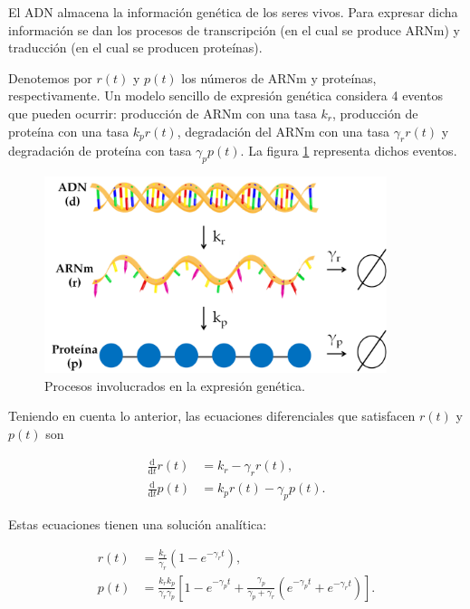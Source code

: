 \documentclass[11pt,letterpaper]{exam}
\begin{document}
\begin{questions}

El ADN almacena la informaci\'on gen\'etica de los seres vivos. Para
expresar dicha informaci\'on se dan los procesos de transcripci\'on
(en el cual se produce ARNm) y traducci\'on (en el cual se producen
prote\'inas).   

Denotemos por $r(t)$ y $p(t)$ los n\'umeros de ARNm y prote\'inas,
respectivamente. Un modelo sencillo de expresi\'on gen\'etica
considera 4 eventos que pueden ocurrir: producci\'on de ARNm con una
tasa $k_r$, producci\'on de prote\'ina con una tasa $k_p r(t)$,
degradaci\'on del ARNm con una tasa $\gamma_rr(t)$ y degradaci\'on de
prote\'ina con tasa $\gamma_pp(t)$. La figura \ref{fig:con-dogma}
representa dichos eventos. 

\begin{figure}[H]
  \centering
  \includegraphics[width=10cm]{Pmas-dogma}
  \caption{\label{fig:con-dogma} Procesos involucrados en la expresi\'on gen\'etica.}
\end{figure}

Teniendo en cuenta lo anterior, las ecuaciones diferenciales que
satisfacen $r(t)$ y $p(t)$ son 

\begin{equation}
\label{eq:dif}
\begin{split}
\frac{\mathrm{d}}{\mathrm{d}t}r(t) &= k_r - \gamma_r r(t),\\
\frac{\mathrm{d}}{\mathrm{d}t}p(t) &= k_pr(t) - \gamma_p p(t).
\end{split}
\end{equation}

Estas ecuaciones tienen una soluci\'on anal\'itica:


\begin{equation}
\label{eq:det}
\begin{split}
r(t) &= \frac{k_r}{\gamma_r}\left(1-e^{-\gamma_rt}\right),\\
p(t) &= \frac{k_rk_p}{\gamma_r\gamma_p}\left[1-e^{-\gamma_pt}+\frac{\gamma_p}{\gamma_p+\gamma_r}\left(e^{-\gamma_pt}+e^{-\gamma_rt}\right)\right].
\end{split}
\end{equation} 


\end{questions}
\end{document}
